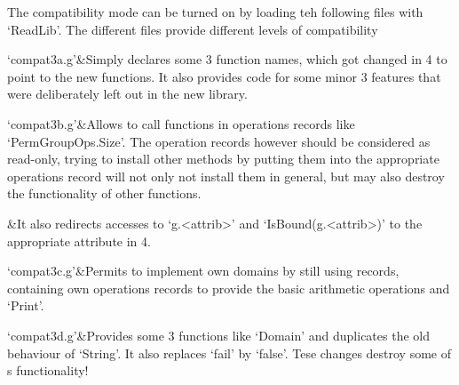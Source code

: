The compatibility mode can be turned on by loading teh following files with
`ReadLib'. The different files provide different levels of compatibility

\beginitems
`compat3a.g'&Simply declares some {\GAP}3 function names, which got changed
in {\GAP}4 to point to the new functions. It also provides code for some
minor {\GAP}3 features that were deliberately left out in the new library.

`compat3b.g'&Allows to call functions in operations records like
`PermGroupOps.Size'. The operation records however should be considered as
read-only, trying to install other methods by putting them into the
appropriate operations record will not only not install them in general, but
may also destroy the functionality of other functions.

&It also redirects accesses to `g.<attrib>' and `IsBound(g.<attrib>)' to the
appropriate attribute in {\GAP}4.

`compat3c.g'&Permits to implement own domains by still using records,
containing own operations records to provide the basic arithmetic operations
and `Print'.

`compat3d.g'&Provides some {\GAP}3 functions like `Domain' and duplicates
the old behaviour of `String'. It also replaces `fail' by `false'. Tese
changes destroy some of {\GAP}s functionality! 

\enditems

